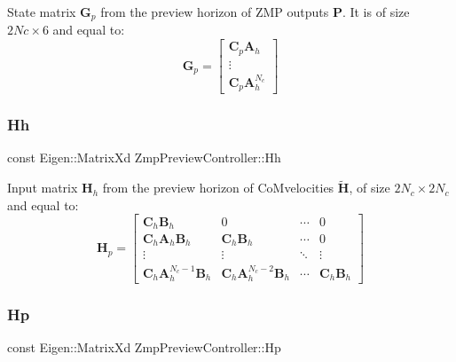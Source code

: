 State matrix $\mathbf{G}_p$ from the preview horizon of Z\+MP outputs $\mathbf{P}$. It is of size $2Nc \times 6$ and equal to\+: \[ \mathbf{G}_p = \left[\begin{array}{c} \mathbf{C}_p\mathbf{A}_h \\ \vdots \\ \mathbf{C}_p\mathbf{A}^{N_c}_h \end{array}\right] \] \hypertarget{classZmpPreviewController_a8caaf8bf8f06e5b0b53d2cd5c131eefd}{}\label{classZmpPreviewController_a8caaf8bf8f06e5b0b53d2cd5c131eefd} 
\subsubsection{\texorpdfstring{Hh}{Hh}}
{\footnotesize\ttfamily const Eigen\+::\+Matrix\+Xd Zmp\+Preview\+Controller\+::\+Hh\hspace{0.3cm}{\ttfamily [private]}}

Input matrix $\mathbf{H}_h$ from the preview horizon of Co\+Mvelocities $\tilde{\mathbf{H}}$, of size $2N_c \times 2N_c$ and equal to\+: \[ \mathbf{H}_p = \left[\begin{array}{cccc} \mathbf{C}_h\mathbf{B}_h & 0 & \cdots & 0 \\ \mathbf{C}_h\mathbf{A}_h\mathbf{B}_h & \mathbf{C}_h\mathbf{B}_h & \cdots & 0 \\ \vdots & \vdots & \ddots & \vdots \\ \mathbf{C}_h\mathbf{A}^{N_c-1}_h\mathbf{B}_h & \mathbf{C}_h\mathbf{A}^{N_c-2}_h\mathbf{B}_h & \cdots & \mathbf{C}_h\mathbf{B}_h \end{array}\right] \] \hypertarget{classZmpPreviewController_a32ab17a3be30490e4a1e874bf3581843}{}\label{classZmpPreviewController_a32ab17a3be30490e4a1e874bf3581843} 
\subsubsection{\texorpdfstring{Hp}{Hp}}
{\footnotesize\ttfamily const Eigen\+::\+Matrix\+Xd Zmp\+Preview\+Controller\+::\+Hp\hspace{0.3cm}{\ttfamily [private]}}

